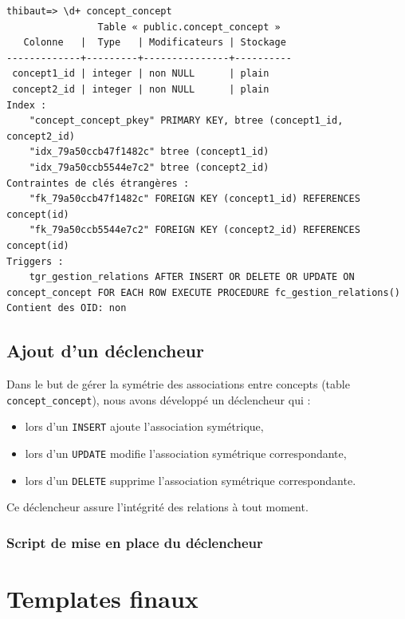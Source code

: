 \begin{verbatim}
thibaut=> \d+ concept_concept
                Table « public.concept_concept »
   Colonne   |  Type   | Modificateurs | Stockage 
-------------+---------+---------------+----------
 concept1_id | integer | non NULL      | plain     
 concept2_id | integer | non NULL      | plain     
Index :
    "concept_concept_pkey" PRIMARY KEY, btree (concept1_id, concept2_id)
    "idx_79a50ccb47f1482c" btree (concept1_id)
    "idx_79a50ccb5544e7c2" btree (concept2_id)
Contraintes de clés étrangères :
    "fk_79a50ccb47f1482c" FOREIGN KEY (concept1_id) REFERENCES concept(id)
    "fk_79a50ccb5544e7c2" FOREIGN KEY (concept2_id) REFERENCES concept(id)
Triggers :
    tgr_gestion_relations AFTER INSERT OR DELETE OR UPDATE ON concept_concept FOR EACH ROW EXECUTE PROCEDURE fc_gestion_relations()
Contient des OID: non

\end{verbatim}

\subsection{Ajout d'un déclencheur}

Dans le but de gérer la symétrie des associations entre concepts (table \texttt{concept\_concept}), nous avons développé un déclencheur qui :
\begin{itemize}
\item lors d'un \texttt{INSERT} ajoute l'association symétrique,
\item lors d'un \texttt{UPDATE} modifie l'association symétrique correspondante,
\item lors d'un \texttt{DELETE} supprime l'association symétrique correspondante.
\end{itemize}

Ce déclencheur assure l'intégrité des relations à tout moment.

\subsubsection{Script de mise en place du déclencheur}


\section{Templates finaux}

